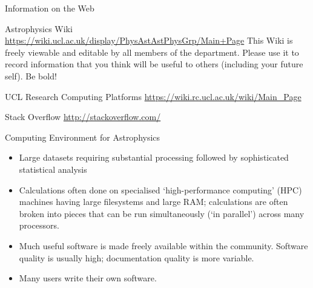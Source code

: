 \documentclass{beamer}
\begin{document}
\begin{frame}{Information on the Web}
  \begin{block}{Astrophysics Wiki}
    \url{https://wiki.ucl.ac.uk/display/PhysAstAstPhysGrp/Main+Page}
    This Wiki is freely viewable and editable by all members of the department. Please use it to record information that you think will be useful to others (including your future self). Be bold!
  \end{block}

  \begin{block}{UCL Research Computing Platforms}
    \url{https://wiki.rc.ucl.ac.uk/wiki/Main_Page}
  \end{block}
  
  \begin{block}{Stack Overflow}
    \url{http://stackoverflow.com/}
  \end{block}
  
\end{frame}



\begin{frame}{Computing Environment for Astrophysics}
  \begin{itemize}
  \item Large datasets requiring substantial processing followed by sophisticated statistical analysis
  \item Calculations often done on specialised `high-performance computing' (HPC) machines having large filesystems and large RAM; calculations are often broken into pieces that can be run simultaneously (`in parallel') across many processors.
  \item Much useful software is made freely available within the community. Software quality is usually high; documentation quality is more variable.
  \item Many users write their own software.
  \end{itemize}
\end{frame}
\end{document}
